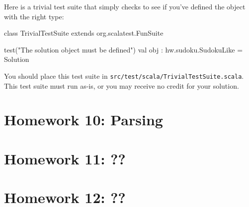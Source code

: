 \documentclass{book}
\begin{document}
Here is a trivial test suite that simply checks to see if you've defined
the  object with the right type:

\begin{scalacode}
class TrivialTestSuite extends org.scalatest.FunSuite {

  test("The solution object must be defined") {
    val obj : hw.sudoku.SudokuLike = Solution
  }
}
\end{scalacode}

You should place this test suite in \texttt{src/test/scala/TrivialTestSuite.scala}. This test suite must run as-is, or you may receive no credit for your solution.



\newlecture

\newlecture


\chapter{Homework 10: Parsing}

\newlecture

\newlecture


\chapter{Homework 11: ??}

\newlecture

\newlecture

\chapter{Homework 12: ??}

\newlecture

\newlecture

\end{document}

